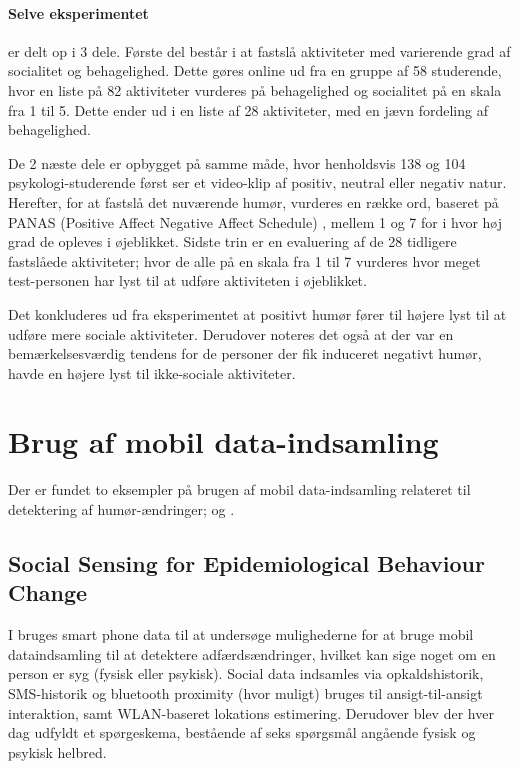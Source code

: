 \paragraph{Selve eksperimentet} er delt op i 3 dele.
Første del består i at fastslå aktiviteter med varierende grad af socialitet og behagelighed.
Dette gøres online ud fra en gruppe af 58 studerende, hvor en liste på 82 aktiviteter vurderes på behagelighed og socialitet på en skala fra 1 til 5.
Dette ender ud i en liste af 28 aktiviteter, med en jævn fordeling af behagelighed.

De 2 næste dele er opbygget på samme måde, hvor henholdsvis 138 og 104 psykologi-studerende først ser et video-klip af positiv, neutral eller negativ natur.
Herefter, for at fastslå det nuværende humør, vurderes en række ord, baseret på PANAS (Positive Affect Negative Affect Schedule) \cite{panas}, mellem 1 og 7 for i hvor høj grad de opleves i øjeblikket.
Sidste trin er en evaluering af de 28 tidligere fastslåede aktiviteter; hvor de alle på en skala fra 1 til 7 vurderes hvor meget test-personen har lyst til at udføre aktiviteten i øjeblikket.

Det konkluderes ud fra eksperimentet at positivt humør fører til højere lyst til at udføre mere sociale aktiviteter.
Derudover noteres det også at der var en bemærkelsesværdig tendens for de personer der fik induceret negativt humør, havde en højere lyst til ikke-sociale aktiviteter.

\section{Brug af mobil data-indsamling}
Der er fundet to eksempler på brugen af mobil data-indsamling relateret til detektering af humør-ændringer; \citet{social_sensing} og \citet{social_sensing_2}.

\subsection{Social Sensing for Epidemiological Behaviour Change}
I \citet{social_sensing} bruges smart phone data til at undersøge mulighederne for at bruge mobil dataindsamling til at detektere adfærdsændringer, hvilket kan sige noget om en person er syg (fysisk eller psykisk).
Social data indsamles via opkaldshistorik, SMS-historik og bluetooth proximity (hvor muligt) bruges til ansigt-til-ansigt interaktion, samt WLAN-baseret lokations estimering.
Derudover blev der hver dag udfyldt et spørgeskema, bestående af seks spørgsmål angående fysisk og psykisk helbred.

